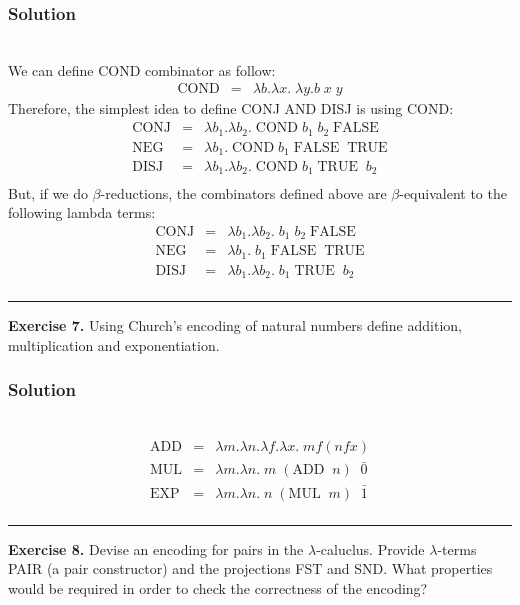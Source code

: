 \documentclass{article}
\newcommand{\lm}[1]{\lambda #1 .}
\newcommand{\qed}{\begin{flushright}\rule{0.7em}{0.7em}\end{flushright}}
\begin{document}
\subsubsection*{Solution} \\
We can define COND combinator as follow:
\begin{equation*}
\begin{array}{lll}
      \text{COND} & =  & \lm{b} \lm{x}\; \lm{y} b \; x \; y
\end{array}
\end{equation*}
Therefore, the simplest idea to define CONJ AND DISJ is using COND:
\begin{equation*}
\begin{array}{lll}
      \text{CONJ} & =  & \lm{b_1} \lm{b_2}\;  \text{COND} \; b_1 \; b_2 \;\text{FALSE}  \\
      \text{NEG} & = &  \lm{b_1} \; \text{COND} \; b_1 \;\text{FALSE} \;\; \text{TRUE}\\
      \text{DISJ} & = &  \lm{b_1} \lm{b_2}\;  \text{COND} \; b_1 \; \text{TRUE} \;\; b_2\\
\end{array}
\end{equation*}
But, if we do $\beta$-reductions, the combinators defined above are $\beta$-equivalent to the following lambda terms:
\begin{equation*}
\begin{array}{lll}
      \text{CONJ} & =  & \lm{b_1} \lm{b_2}\;  b_1 \; b_2 \;\text{FALSE}  \\
      \text{NEG} & = &  \lm{b_1} \; b_1 \;\text{FALSE} \;\; \text{TRUE}\\
      \text{DISJ} & = &  \lm{b_1} \lm{b_2}\;  b_1 \; \text{TRUE} \;\; b_2\\
\end{array}
\end{equation*}
\qed
\textbf{Exercise 7.} Using Church's encoding of natural numbers define addition, multiplication and exponentiation.
\subsubsection*{Solution} \\
\begin{equation*}
\begin{array}{lll}
      \text{ADD} & =  & \lm{m} \lm{n}\lm{f}\lm{x}\;  m f (n f x)  \\
      \text{MUL} & = &  \lm{m} \lm{n} \; m \; (\text{ADD} \; \; n) \; \; \bar{0}\\
      \text{EXP} & = &  \lm{m} \lm{n} \; n \; (\text{MUL} \; \; m) \; \; \bar{1}\\
\end{array}
\end{equation*}
\qed
\textbf{Exercise 8.} Devise an encoding for pairs in the $\lambda$-caluclus. Provide $\lambda$-terms PAIR (a pair constructor) and the projections FST and SND. What properties would be required in order to check the correctness of the encoding?
\end{document}
